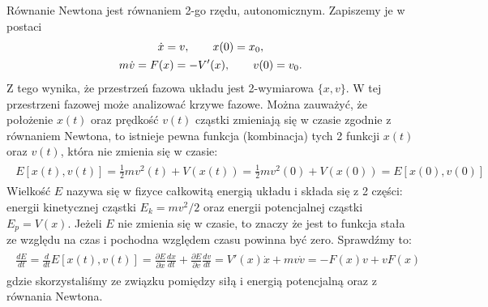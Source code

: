 \documentclass[a4paper,12pt,polish]{sphinxmanual}
\begin{document}
Równanie Newtona jest równaniem 2-go rzędu, autonomicznym.   Zapiszemy je w postaci
\label{ch1/chI022:equation-eqn3}\begin{gather}
\begin{split}\dot x = v, \qquad x(0)=x_0,\end{split}\label{ch1/chI022-eqn3}\\\begin{split}m\dot v = F(x) = -V'(x),  \qquad v(0)=v_0.\end{split}\notag
\end{gather}
Z tego wynika, że przestrzeń fazowa układu jest 2-wymiarowa $\{x, v\}$. W tej przestrzeni fazowej może analizować krzywe fazowe. Można zauważyć, że położenie $x(t)$ oraz prędkość $v(t)$ cząstki zmieniają się w czasie zgodnie z równaniem Newtona, to istnieje pewna funkcja (kombinacja) tych 2 funkcji $x(t)$ oraz $v(t)$, która nie zmienia się w czasie:
\label{ch1/chI022:equation-eqn4}\begin{gather}
\begin{split}E[x(t), v(t)] = \frac{1}{2} m v^2(t) + V(x(t)) = \frac{1}{2} m v^2(0) + V(x(0)) = E[x(0), v(0)]\end{split}\label{ch1/chI022-eqn4}
\end{gather}
Wielkość $E$ nazywa się  w fizyce całkowitą energią układu i składa się z 2 części: energii kinetycznej cząstki $E_k=mv^2/2$ oraz energii potencjalnej  cząstki $E_p = V(x)$. Jeżeli $E$ nie zmienia się w czasie, to znaczy że jest to funkcja stała ze względu na czas i pochodna względem czasu powinna być zero. Sprawdźmy to:
\label{ch1/chI022:equation-eqn5}\begin{gather}
\begin{split}\frac{dE}{dt} = \frac{d}{dt}  E[x(t), v(t)] = \frac{\partial E}{\partial x}  \frac{dx}{dt} + \frac{\partial E}{\partial v}  \frac{dv}{dt} =  V'(x)  \dot x +  mv \dot v = -F(x) v + v F(x)\end{split}\label{ch1/chI022-eqn5}
\end{gather}
gdzie skorzystaliśmy ze związku pomiędzy siłą i energią potencjalną oraz z równania Newtona.
\end{document}
